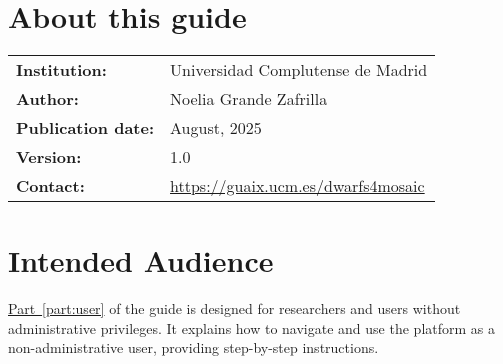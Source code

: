 



\newcommand{\project}{\textsf{Dwarfs4MOSAIC}\xspace}
\newcommand{\prjInstitution}{Universidad Complutense de Madrid\xspace}
\newcommand{\prjAuthor}{Noelia Grande Zafrilla\xspace}
\newcommand{\prjPubDate}{August, 2025\xspace} %
\newcommand{\prjVersion}{1.0\xspace}
\newcommand{\prjUrl}{\url{https://guaix.ucm.es/dwarfs4mosaic}\xspace}



	
	\pagestyle{empty}   %
	
	
	
	\setlength{\parskip}{1em}    %
	\setlength{\parindent}{0pt}  %
	
	\section*{About this guide}
	
	\begin{flushleft}
		\begin{tabular}{ll}
			\textbf{Institution:} & \prjInstitution \\
			\textbf{Author:} & \prjAuthor \\
			\textbf{Publication date:} & \prjPubDate \\
			\textbf{Version:} & 1.0 \\
			\textbf{Contact:} & \prjUrl \\
		\end{tabular}
	\end{flushleft}
	
	\vspace{2cm}
	
	\section*{Intended Audience}
	
	\hyperref[part:user]{Part~\ref*{part:user}} of the guide is designed for researchers and users without administrative privileges. It explains how to navigate and use the \app platform as a non-administrative user, providing step-by-step instructions.
	
